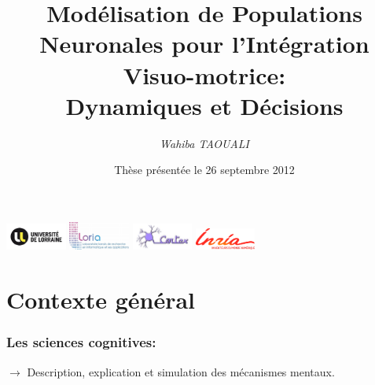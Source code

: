 \documentclass[10pt]{beamer}
\title[Dynamiques et D\'ecisions]{Mod\'elisation de Populations Neuronales pour l'Int\'egration Visuo-motrice:\\Dynamiques et D\'ecisions}
\date[soutenance]{ Th\`ese pr\'esent\'ee le 26 septembre 2012}
\author{\em Wahiba TAOUALI}
\begin{document}



\begin{frame}
  \titlepage
  \initclock

\includegraphics [width=2cm]{lorraine-universite}
\hspace*{0.2\textwidth}
\includegraphics [width=2cm]{loria}
\hspace*{0.05\textwidth}
\includegraphics [width=2cm]{cortex}
\hspace*{0.05\textwidth}
\includegraphics [width=2cm]{inria}\\

\end{frame}


\section{Contexte g\'en\'eral}
\begin{frame}
  \frametitle{Les sciences cognitives:}
$\to$ Description, explication et simulation des m\'ecanismes mentaux.
\end{frame}
\end{document}
